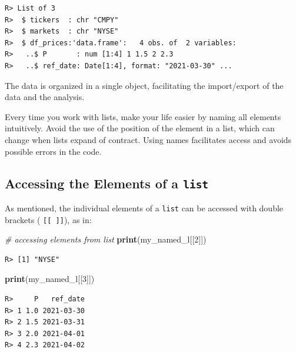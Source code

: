 \documentclass[
  12pt,
]{book}
\newenvironment{Shaded}{\begin{snugshade}}{\end{snugshade}}
\newcommand{\CommentTok}[1]{\textcolor[rgb]{0.37,0.37,0.37}{\textit{#1}}}
\newcommand{\DecValTok}[1]{\textcolor[rgb]{0.06,0.06,0.06}{#1}}
\newcommand{\KeywordTok}[1]{\textcolor[rgb]{0.27,0.27,0.27}{\textbf{#1}}}
\newcommand{\NormalTok}[1]{#1}
\newenvironment{rmdimportant}
{\begin{importantblock}
		
	} {\end{importantblock}}
\begin{document}
\begin{verbatim}
R> List of 3
R>  $ tickers  : chr "CMPY"
R>  $ markets  : chr "NYSE"
R>  $ df_prices:'data.frame':   4 obs. of  2 variables:
R>   ..$ P       : num [1:4] 1 1.5 2 2.3
R>   ..$ ref_date: Date[1:4], format: "2021-03-30" ...
\end{verbatim}

The data is organized in a single object, facilitating the import/export of the data and the analysis.

\begin{rmdimportant}
Every time you work with lists, make your life easier by naming all
elements intuitively. Avoid the use of the position of the element in a
list, which can change when lists expand of contract. Using names
facilitates access and avoids possible errors in the code.
\end{rmdimportant}

\hypertarget{accessing-the-elements-of-a-list}{%
\subsection{\texorpdfstring{Accessing the Elements of a \texttt{list}}{Accessing the Elements of a list}}\label{accessing-the-elements-of-a-list}}

As mentioned, the individual elements of a \texttt{list} can be accessed with double brackets ( \texttt{{[}{[}\ {]}{]}}), as in: \index{[[ ]]}

\begin{Shaded}
\begin{Highlighting}[]
\CommentTok{# accessing elements from list}
\KeywordTok{print}\NormalTok{(my_named_l[[}\DecValTok{2}\NormalTok{]])}
\end{Highlighting}
\end{Shaded}

\begin{verbatim}
R> [1] "NYSE"
\end{verbatim}

\begin{Shaded}
\begin{Highlighting}[]
\KeywordTok{print}\NormalTok{(my_named_l[[}\DecValTok{3}\NormalTok{]])}
\end{Highlighting}
\end{Shaded}

\begin{verbatim}
R>     P   ref_date
R> 1 1.0 2021-03-30
R> 2 1.5 2021-03-31
R> 3 2.0 2021-04-01
R> 4 2.3 2021-04-02
\end{verbatim}
\end{document}
